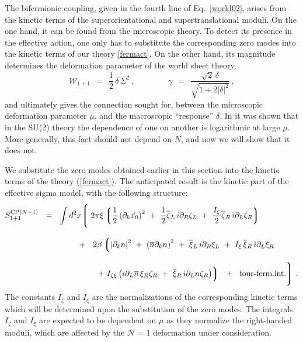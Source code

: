 \documentclass[12pt]{article}
\newcommand{\none}{${\mathcal N}=1$ }
\newcommand{\p}{\partial}
\newcommand{\ov}{\overline}
\newcommand{\lgr}{\left\lgroup}
\newcommand{\rgr}{\right\rgroup}
\begin{document}
	The bifermionic coupling, given in the fourth line of Eq.~\eqref{world02}, arises from the 
	kinetic terms of the superorientational and supertranslational moduli.
	On the one hand, it can be found from the microscopic theory. 
	To detect its presence in the effective action, one only has to substitute the corresponding zero modes 
	into the kinetic terms of our theory \eqref{fermact}.
	On the other hand, its magnitude determines the deformation parameter  of the world sheet theory, 
\[
	\mathcal{W}_{1+1} ~~=~~ \frac{1}{2}\,\delta\,\Sigma^2~,
	\qquad\qquad
	\gamma ~~=~~ \frac { \sqrt{2}\,\delta } { \sqrt{ 1 +  2 |\delta|^2 } }\,,
\]
	and ultimately gives the connection sought for, between the microscopic deformation parameter $ \mu $, and 
	the macroscopic ``response'' $ \delta $.
	In \cite{SYhet} it was shown that in the SU(2) theory the dependence of one on another is logarithmic at large 
	$ \mu $.
	More generally, this fact should not depend on $ N $, and now we will show that it does not.

	We substitute the zero modes obtained earlier in this section into the kinetic terms of the theory
	(\ref{fermact}).
	The anticipated result is the kinetic part of the effective sigma model, with the following structure:
\begin{align}
%
\label{world_unnorm}
	S_{\rm 1+1}^{{\rm CP}(N-1)} ~~=~~  \int d^2x 
	\Biggl\lgroup\; 
	&
		2\pi\xi \lgr   \frac{1}{2} \left(\p_k \vec{x}_0 \right)^2
				~+~  \frac{1}{2} \ov{\zeta}{}_L\, i\p_R \zeta_L 
				~+~  \frac{I_\zeta}{2} \ov{\zeta}{}_R\, i\p_L \zeta_R
			\rgr
	\\[3mm]
%
\notag
	~~+~~  
	&\;
	2\beta \lgr \left|\p_k n \right|^2  ~+~ \left(\ov{n}\p_k n\right)^2  
		~+~ \ov{\xi}{}_L\, i\p_R \xi_L  ~+~  I_\xi\, \ov{\xi}{}_R\, i\p_L  \xi_R
		\right .
	\\[3mm]
%
\notag
	&\;
		\left. 
		~+~ I_{\zeta\xi} 
			\left(  i\p_L\ov{n}\, \xi_R \zeta_R ~+~  \ov{\xi}{}_R \, i\p_L n \zeta_R \right)
	 \rgr
	~~+~~  \text{four-ferm.int.}
	\Biggr\rgroup ~.
\end{align}
	The constants  $ I_\zeta $ and $ I_\xi $ are the normalizations
	of the corresponding kinetic terms which will be determined upon the substitution of the
	zero modes.
	The integrals $ I_\zeta $ and $ I_\xi $ are expected to be dependent on $ \mu $ as they
	normalize the right-handed moduli, which are affected by the \none deformation
	under consideration.
\end{document}
